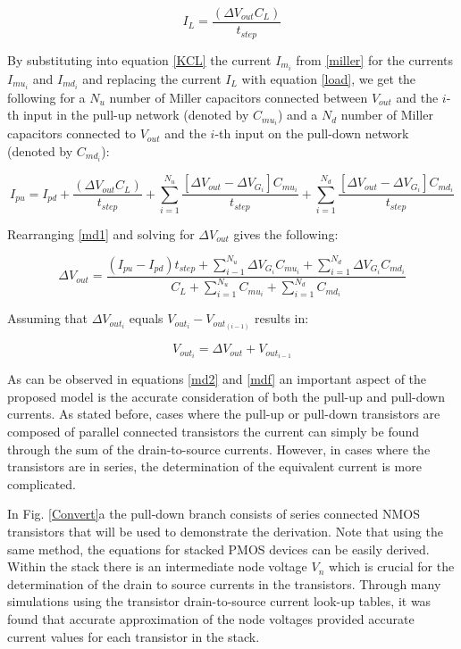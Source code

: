 \begin{equation} \label{load}
I_L = \frac{(\Delta V_{out}C_L)}{t_{step}}
\end{equation}

By substituting into equation \ref{KCL} the current $I_{m_i}$ from \ref{miller} for the currents $I_{mu_i}$ and $I_{md_i}$ and replacing the current $I_L$ with equation \ref{load}, we get the following for a $N_u$ number of Miller capacitors connected between $V_{out}$ and the $i$-th input in the pull-up network (denoted by $C_{mu_i}$) and a $N_d$ number of Miller capacitors connected to $V_{out}$ and the $i$-th input on the pull-down network (denoted by $C_{md_i}$): 

\begin{equation} \label{md1}
I_{pu} = I_{pd} + \frac{(\Delta V_{out}C_L)}{t_{step}} + \sum_{i=1}^{N_u} \frac{[\Delta V_{out} - \Delta V_{G_i}]C_{mu_i}}{t_{step}} + \sum_{i=1}^{N_d} \frac{[\Delta V_{out} - \Delta V_{G_i}]C_{md_i}}{t_{step}}
\end{equation} 

Rearranging \ref{md1} and solving for $\Delta V_{out}$ gives the following:

\begin{equation} \label{md2}
\Delta V_{out} = \frac{(I_{pu}-I_{pd})t_{step} + \sum_{i-1}^{N_u} \Delta V_{G_i}C_{mu_i} + \sum_{i=1}^{N_d} \Delta V_{G_i}C_{md_i}}{C_L + \sum_{i=1}^{N_u}C_{mu_i} + \sum_{i=1}^{N_d}C_{md_i}}
\end{equation}

Assuming that $\Delta V_{out_i}$ equals $V_{out_i} - V_{out_{(i-1)}}$ results in:

\begin{equation} \label{mdf}
V_{out_i} = \Delta V_{out} + V_{out_{i-1}}
\end{equation}

As can be observed in equations \ref{md2} and \ref{mdf} an important aspect of the proposed model is the accurate consideration of both the pull-up and pull-down currents. As stated before, cases where the pull-up or pull-down transistors are composed of parallel connected transistors the current can simply be found through the sum of the drain-to-source currents. However, in cases where the transistors are in series, the determination of the equivalent current is more complicated.

In Fig. \ref{Convert}a the pull-down branch consists of series connected NMOS transistors that will be used to demonstrate the derivation. Note that using the same method, the equations for stacked PMOS devices can be easily derived. Within the stack there is an intermediate node voltage $V_n$ which is crucial for the determination of the drain to source currents in the transistors. Through many simulations using the transistor drain-to-source current look-up tables, it was found that accurate approximation of the node voltages provided accurate current values for each transistor in the stack. 

